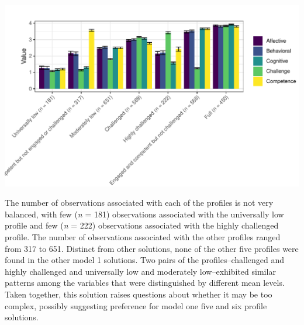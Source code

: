 \documentclass[]{msu-thesis}
\theoremstyle{definition}
\theoremstyle{definition}
\theoremstyle{definition}
\theoremstyle{remark}
\begin{document}
\begin{center}\includegraphics[width=0.9\linewidth]{rosenberg-dissertation_files/figure-latex/m1_7p-2} \end{center}

The number of observations associated with each of the profiles is not
very balanced, with few (\emph{n} = 181) observations associated with
the universally low profile and few (\emph{n} = 222) observations
associated with the highly challenged profile. The number of
observations associated with the other profiles ranged from 317 to 651.
Distinct from other solutions, none of the other five profiles were
found in the other model 1 solutions. Two pairs of the
profiles--challenged and highly challenged and universally low and
moderately low--exhibited similar patterns among the variables that were
distinguished by different mean levels. Taken together, this solution
raises questions about whether it may be too complex, possibly
suggesting preference for model one five and six profile solutions.


\end{document}
